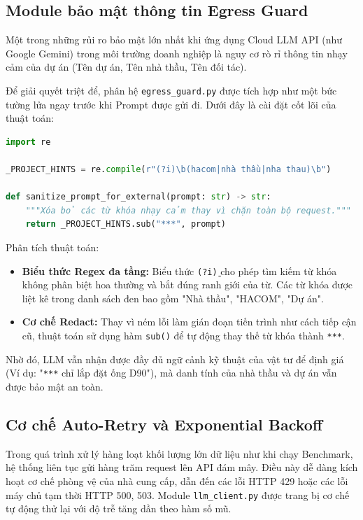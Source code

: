 \subsection{Module bảo mật thông tin Egress Guard}
Một trong những rủi ro bảo mật lớn nhất khi ứng dụng Cloud LLM API (như Google Gemini) trong môi trường doanh nghiệp là nguy cơ rò rỉ thông tin nhạy cảm của dự án (Tên dự án, Tên nhà thầu, Tên đối tác). 

Để giải quyết triệt để, phân hệ \texttt{egress\_guard.py} được tích hợp như một bức tường lửa ngay trước khi Prompt được gửi đi. Dưới đây là cài đặt cốt lõi của thuật toán:

\begin{lstlisting}[language=Python, caption=Cài đặt thuật toán Redact trong Egress Guard]
import re

_PROJECT_HINTS = re.compile(r"(?i)\b(hacom|nhà thầu|nha thau)\b")

def sanitize_prompt_for_external(prompt: str) -> str:
    """Xóa bỏ các từ khóa nhạy cảm thay vì chặn toàn bộ request."""
    return _PROJECT_HINTS.sub("***", prompt)
\end{lstlisting}

Phân tích thuật toán:
\begin{itemize}
    \item \textbf{Biểu thức Regex đa tầng:} Biểu thức \texttt{(?i)\b} cho phép tìm kiếm từ khóa không phân biệt hoa thường và bắt đúng ranh giới của từ. Các từ khóa được liệt kê trong danh sách đen bao gồm "Nhà thầu", "HACOM", "Dự án".
    \item \textbf{Cơ chế Redact:} Thay vì ném lỗi làm gián đoạn tiến trình như cách tiếp cận cũ, thuật toán sử dụng hàm \texttt{sub()} để tự động thay thế từ khóa thành \texttt{***}.
\end{itemize}
Nhờ đó, LLM vẫn nhận được đầy đủ ngữ cảnh kỹ thuật của vật tư để định giá (Ví dụ: "\texttt{***} chỉ lắp đặt ống D90"), mà danh tính của nhà thầu và dự án vẫn được bảo mật an toàn.

\subsection{Cơ chế Auto-Retry và Exponential Backoff}
Trong quá trình xử lý hàng loạt khối lượng lớn dữ liệu như khi chạy Benchmark, hệ thống liên tục gửi hàng trăm request lên API đám mây. Điều này dễ dàng kích hoạt cơ chế phòng vệ của nhà cung cấp, dẫn đến các lỗi HTTP 429 hoặc các lỗi máy chủ tạm thời HTTP 500, 503.
Module \texttt{llm\_client.py} được trang bị cơ chế tự động thử lại với độ trễ tăng dần theo hàm số mũ.

